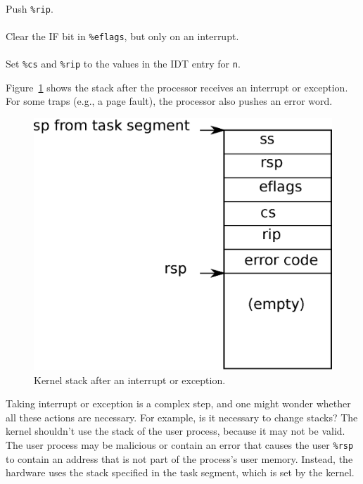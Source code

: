 \paragraph{\textbullet}Push
\texttt{\%rip}.
\paragraph{\textbullet}Clear the IF bit in
\texttt{\%eflags},
but only on an interrupt.
\paragraph{\textbullet}Set 
\texttt{\%cs}
and
\texttt{\%rip}
to the values in the IDT entry for
\lstinline{n}.

Figure~\ref{fig:intkstack} 
shows the stack after the processor receives
an interrupt or exception.
For some traps (e.g., a page fault), the processor also pushes an
error word. 

\begin{figure}[t]
\center
\includegraphics[scale=0.5]{fig/intkstack.eps}
\caption{Kernel stack after an interrupt or exception.}
\label{fig:intkstack}
\end{figure}

Taking interrupt or exception
is a complex step, and one might wonder whether all
these actions are necessary.
For example, is it necessary to change stacks?
The kernel shouldn't use the stack of the user process, because it may not be valid.
The user process may be malicious or
contain an error that causes the user
\texttt{\%rsp} 
to contain an address that is not part of the process's user memory.
Instead, the hardware uses the
stack specified in the task segment, which is set by the kernel.

